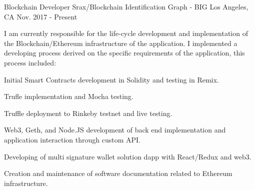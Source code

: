 


\begin{cventries}


\cventry
{Blockchain Developer} %
{Srax/Blockchain Identification Graph - BIG} %
{Los Angeles, CA} %
{Nov. 2017 - Present} %
{ %
\begin{cvitems}
\item[] {I am currently responsible for the life-cycle development and implementation of the Blockchain/Ethereum infrastructure of the application. I implemented a developing process derived on the specific requirements of the application, this process included:} %
\item {Initial Smart Contracts development in Solidity and testing in Remix.}
\item {Trufle implementation and Mocha testing.}
\item {Truffle deployment to Rinkeby testnet and live testing.}
\item {Web3, Geth, and Node.JS development of back end implementation and application interaction through custom API.}
\item {Developing of multi signature wallet solution dapp with React/Redux and web3.}
\item {Creation and maintenance of software documentation related to Ethereum infrastructure.}
\end{cvitems}
}



\end{cventries}
